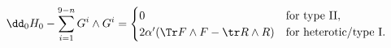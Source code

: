 \begin{equation}
   \dd_0 H_0 - \sum_{i=1}^{9-n} G^i \wedge G^i = \begin{cases} 
         0 & \text{for type II}, \\
         2\alpha'(\Tr F\wedge F -\tr R\wedge R)& \text{for heterotic/type I}. 
      \end{cases}
\end{equation}


